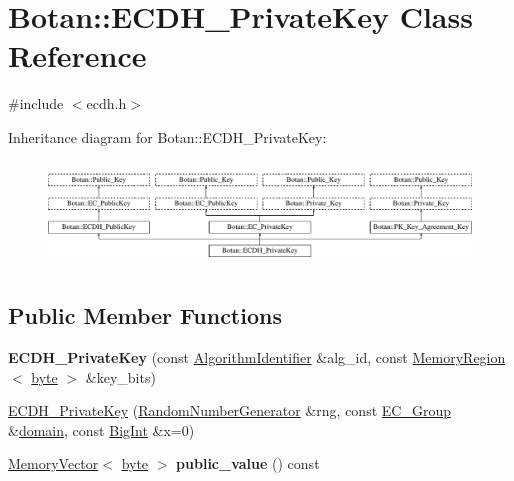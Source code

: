 \hypertarget{classBotan_1_1ECDH__PrivateKey}{\section{Botan\-:\-:E\-C\-D\-H\-\_\-\-Private\-Key Class Reference}
\label{classBotan_1_1ECDH__PrivateKey}
}


{\ttfamily \#include $<$ecdh.\-h$>$}

Inheritance diagram for Botan\-:\-:E\-C\-D\-H\-\_\-\-Private\-Key\-:\begin{figure}[H]
\begin{center}
\leavevmode
\includegraphics[height=2.800000cm]{classBotan_1_1ECDH__PrivateKey}
\end{center}
\end{figure}
\subsection*{Public Member Functions}
\begin{DoxyCompactItemize}
\item 
\hypertarget{classBotan_1_1ECDH__PrivateKey_a0d8df71c979197e8e32372b862bcc1b7}{{\bfseries E\-C\-D\-H\-\_\-\-Private\-Key} (const \hyperlink{classBotan_1_1AlgorithmIdentifier}{Algorithm\-Identifier} \&alg\-\_\-id, const \hyperlink{classBotan_1_1MemoryRegion}{Memory\-Region}$<$ \hyperlink{namespaceBotan_a7d793989d801281df48c6b19616b8b84}{byte} $>$ \&key\-\_\-bits)}\label{classBotan_1_1ECDH__PrivateKey_a0d8df71c979197e8e32372b862bcc1b7}

\item 
\hyperlink{classBotan_1_1ECDH__PrivateKey_a33849187a33f14f8f967bb50f6bcfc51}{E\-C\-D\-H\-\_\-\-Private\-Key} (\hyperlink{classBotan_1_1RandomNumberGenerator}{Random\-Number\-Generator} \&rng, const \hyperlink{classBotan_1_1EC__Group}{E\-C\-\_\-\-Group} \&\hyperlink{classBotan_1_1EC__PublicKey_a5fe61411ec55d30d9cf0c36116223a71}{domain}, const \hyperlink{classBotan_1_1BigInt}{Big\-Int} \&x=0)
\item 
\hypertarget{classBotan_1_1ECDH__PrivateKey_ae81b0807a3a1a94a113c31c634d9ee7e}{\hyperlink{classBotan_1_1MemoryVector}{Memory\-Vector}$<$ \hyperlink{namespaceBotan_a7d793989d801281df48c6b19616b8b84}{byte} $>$ {\bfseries public\-\_\-value} () const }\label{classBotan_1_1ECDH__PrivateKey_ae81b0807a3a1a94a113c31c634d9ee7e}

\end{DoxyCompactItemize}
